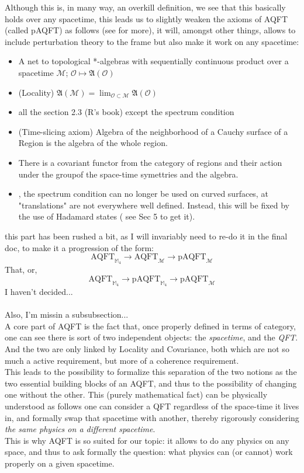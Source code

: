 \documentclass[a4paper,11pt]{article}
\numberwithin{equation}{section}
\theoremstyle{definition}
\begin{document}
Although this is, in many way, an overkill definition, we see that this basically holds over any spacetime, this leads us to slightly weaken the axioms of AQFT (called pAQFT) as follows (see \cite{pAQFT} for more), it will, amongst other things, allows to include perturbation theory to the frame but also make it work on any spacetime:
\begin{itemize}
    \item A net to topological *-algebras with sequentially continuous product over a spacetime $\mathcal{M}$; $\mathcal{O}\mapsto\mathfrak{A}(\mathcal{O})$
    \item (Locality) $\mathfrak{A}(\mathcal{M})=\lim_{\mathcal{O}\subset\mathcal{M}}\mathfrak{A}(\mathcal{O})$
    \item all the section 2.3 (R's book) except the spectrum condition
    \item (Time-slicing axiom) Algebra of the neighborhood of a Cauchy surface of a Region is the algebra of the whole region.
    \item There is a covariant functor from the category of regions and their action under the groupof the space-time symettries and the algebra.
    \item, the spectrum condition can no longer be used on curved surfaces, at "translations" are not everywhere well defined. Instead, this will be fixed by the use of Hadamard states (\color{red} see Sec 5 to get it\color{black}).
\end{itemize}
\color{red} this part has been rushed a bit, as I will invariably need to re-do it in the final doc, to make it a progression of the form:
$$\mathrm{AQFT}_{\mathbb{M}_4}\to\mathrm{AQFT}_\mathcal{M}\to\mathrm{pAQFT}_\mathcal{M}$$
That, or, 
$$\mathrm{AQFT}_{\mathbb{M}_4}\to\mathrm{pAQFT}_{\mathbb{M}_4}\to\mathrm{pAQFT}_\mathcal{M}$$
I haven't decided...\\ \\
Also, I'm missin a subsubsection...\color{black}\\
A core part of AQFT is the fact that, once properly defined in terms of category, one can see there is sort of two independent objects: the \emph{spacetime}, and the \emph{QFT}. And the two are only linked by Locality and Covariance, both which are not so much a active requirement, but more of a coherence requirement.\\
This leads to the possibility to formalize this separation of the two notions as the two essential building blocks of an AQFT, and thus to the possibility of changing one without the other. This (purely mathematical fact) can be physically understood as follows one can consider a QFT regardless of the space-time it lives in, and formally swap that spacetime with another, thereby rigorously considering \emph{the same physics on a different spacetime}.\\
This is why AQFT is so suited for our topic: it allows to do any physics on any space, and thus to ask formally the question: what physics can (or cannot) work properly on a given spacetime.
\end{document}
